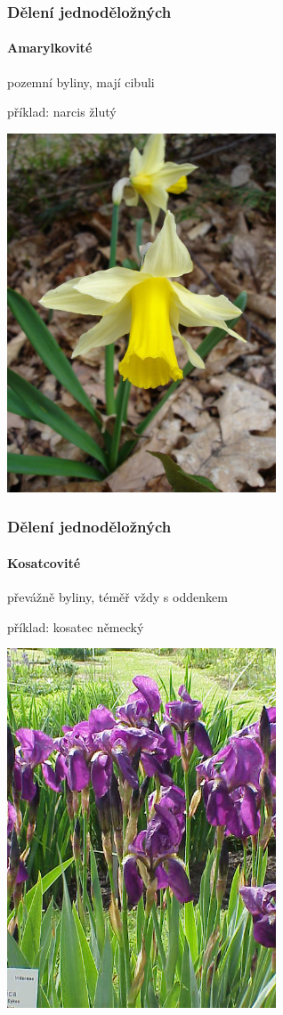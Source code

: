 \documentclass{beamer}
\begin{document}
\begin{frame}
\frametitle{Dělení jednoděložných}
\framesubtitle{Amarylkovité}
pozemní byliny, mají cibuli

příklad: narcis žlutý %

\begin{center}\includegraphics[width=8cm]{Narcissus_pseudonarcissus1.jpg}\end{center}

\end{frame}
\begin{frame}
\frametitle{Dělení jednoděložných}
\framesubtitle{Kosatcovité}

převážně byliny, téměř vždy s oddenkem

příklad: kosatec německý %

\begin{center}\includegraphics[width=8cm]{Iris_germanica10.jpg}\end{center}

\end{frame}
\end{document}
